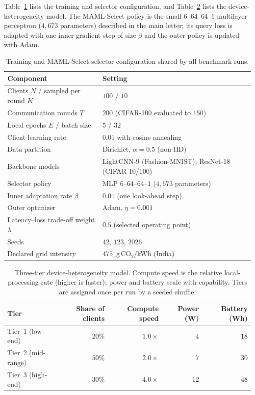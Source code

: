 \documentclass[10pt]{article}
\begin{document}
Table~\ref{tab:supp_config} lists the training and selector configuration, and Table~\ref{tab:supp_tiers} lists the device-heterogeneity model. The MAML-Select policy is the small $6$--$64$--$64$--$1$ multilayer perceptron ($4{,}673$ parameters) described in the main letter; its query loss is adapted with one inner gradient step of size $\beta$ and the outer policy is updated with Adam.

\begin{table}[!ht]
\centering
\caption{Training and MAML-Select selector configuration shared by all benchmark runs.}
\label{tab:supp_config}
\small
\begin{tabular}{@{}ll@{}}
\toprule
Component & Setting \\
\midrule
Clients $N$ / sampled per round $K$ & $100$ / $10$ \\
Communication rounds $T$ & $200$ (CIFAR-100 evaluated to $150$) \\
Local epochs $E$ / batch size & $5$ / $32$ \\
Client learning rate & $0.01$ with cosine annealing \\
Data partition & Dirichlet, $\alpha=0.5$ (non-IID) \\
Backbone models & LightCNN-9 (Fashion-MNIST); ResNet-18 (CIFAR-10/100) \\
\midrule
Selector policy & MLP $6$--$64$--$64$--$1$ ($4{,}673$ parameters) \\
Inner adaptation rate $\beta$ & $0.01$ (one look-ahead step) \\
Outer optimizer & Adam, $\eta=0.001$ \\
Latency--loss trade-off weight $\lambda$ & $0.5$ (selected operating point) \\
\midrule
Seeds & $42$, $123$, $2026$ \\
Declared grid intensity & $475$~g\,CO$_2$/kWh (India) \\
\bottomrule
\end{tabular}
\end{table}

\begin{table}[!ht]
\centering
\caption{Three-tier device-heterogeneity model. Compute speed is the relative local-processing rate (higher is faster); power and battery scale with capability. Tiers are assigned once per run by a seeded shuffle.}
\label{tab:supp_tiers}
\small
\begin{tabular}{@{}lrrrr@{}}
\toprule
Tier & Share of clients & Compute speed & Power (W) & Battery (Wh) \\
\midrule
Tier~1 (low-end)  & $20\%$ & $1.0\times$ & $4$  & $18$ \\
Tier~2 (mid-range) & $50\%$ & $2.0\times$ & $7$  & $30$ \\
Tier~3 (high-end) & $30\%$ & $4.0\times$ & $12$ & $48$ \\
\bottomrule
\end{tabular}
\end{table}
\end{document}
